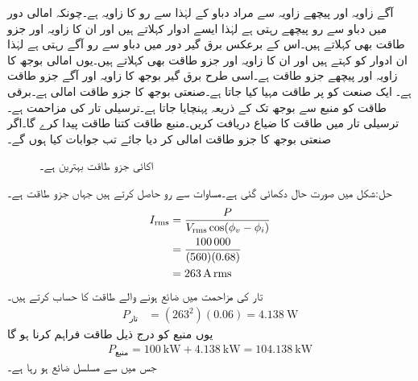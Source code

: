 آگے زاویہ اور پیچھے زاویہ سے مراد دباو کے لہٰذا سے رو کا زاویہ ہے۔چونکہ امالی دور میں دباو سے رو پیچھے رہتی ہے لہٰذا ایسے ادوار  کہلاتے ہیں اور ان کا زاویہ اور جزو طاقت بھی  کہلاتے ہیں۔اس کے برعکس برق گیر دور میں دباو سے رو آگے رہتی ہے لہٰذا ان ادوار کو  کہتے ہیں اور ان کا زاویہ اور جزو طاقت بھی  کہلاتے ہیں۔یوں امالی بوجھ  کا زاویہ   اور پیچھے جزو طاقت  ہے۔اسی طرح برق گیر بوجھ  کا زاویہ  اور آگے جزو طاقت  ہے۔
ایک صنعت کو  پر  طاقت مہیا کیا جاتا ہے۔صنعتی بوجھ کا جزو طاقت  امالی ہے۔برقی طاقت کو منبع سے بوجھ تک  کے ذریعہ پہنچایا جاتا ہے۔ترسیلی تار کی مزاحمت  ہے۔ترسیلی تار میں طاقت کا ضیاع دریافت کریں۔منبع طاقت کتنا طاقت پیدا کرے گا۔اگر صنعتی بوجھ کا جزو طاقت  امالی کر دیا جائے تب جوابات کیا ہوں گے۔
\begin{figure}
\centering
{}
\caption{اکائی جزو طاقت بہترین ہے۔}
\label{شکل_طاقت_جزو_طاقت_کے_اثرات}
\end{figure}

حل:شکل  میں صورت حال دکھائی گئی ہے۔مساوات  سے رو حاصل کرتے ہیں جہاں  جزو طاقت ہے۔
\begin{align*}
{\ensuremath{I_{\textup{rms}}}}&=\frac{P}{{V_{\textup{rms}}} \cos(\phi_v-\phi_i)}\\
&=\frac{\num{100000}}{(560)(0.68)}\\
&=\SI{263}{\ampere}\,{\textup{rms}}
\end{align*}
تار کی مزاحمت میں ضائع ہونے والے طاقت کا حساب کرتے ہیں۔
\begin{align*}
P_{\text{تار}}&=(263^2)(0.06)=\SI{4.138}{\watt}
\end{align*}
یوں منبع کو درج ذیل طاقت فراہم کرنا ہو گا
\begin{align*}
P_{\text{منبع}}=\SI{100}{\kilo\watt}+\SI{4.138}{\kilo\watt}=\SI{104.138}{\kilo\watt}
\end{align*} 
جس میں سے  مسلسل ضائع ہو رہا ہے۔

